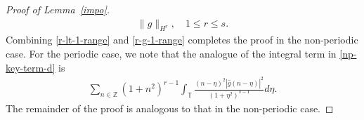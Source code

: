 \documentclass[12pt,reqno]{amsart}
\numberwithin{equation}{section}  %
\numberwithin{figure}{section}
\newcommand{\rr}{\mathbb{R}}
\newcommand{\zz}{\mathbb{Z}}
\newcommand{\ci}{\mathbb{T}}
\newcommand{\wh}{\widehat}
\newtheorem{lemma}[theorem]{Lemma}
\newtheorem{definition}[theorem]{Definition}
\begin{document}
\begin{proof}[Proof of Lemma~\ref{impo}]
\begin{equation}
\begin{split}
  \| g \|_{H^{r}}, \quad 1 \le r \le s. 
\end{split}
\end{equation}
%
Combining \eqref{r-lt-1-range} and \eqref{r-g-1-range} completes the proof in
the non-periodic case. For the periodic case, we note that the analogue of the
integral term in \eqref{np-key-term-d} is
%
%
%
\begin{equation*}
\begin{split}
  \sum_{n \in \zz}   (1 + n^{2})^{r-1}\int_{\ci} \frac{(n - \eta)^{2}| \wh{g}(n
  - \eta) |^{2}}{(1 + \eta^{2})^{s-1}} d \eta. 
\end{split}
\end{equation*}
%
%
The remainder of the proof is analogous to that in the non-periodic case.
\end{proof}
\end{document}
